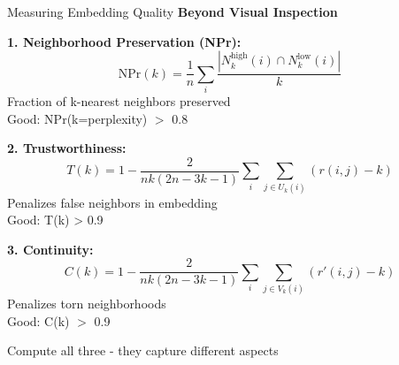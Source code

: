 \documentclass[10pt]{beamer}
\newcommand{\emphtext}[1]{\textcolor{upcblue}{\textbf{#1}}}
\newcommand{\conceptbox}[1]{\colorbox{upcblue!10}{\begin{minipage}{0.85\textwidth}\centering #1\end{minipage}}}
\begin{document}
\begin{frame}{Measuring Embedding Quality}
\emphtext{Beyond Visual Inspection}

\vspace{0.3cm}
\textbf{1. Neighborhood Preservation (NPr):}
$$\text{NPr}(k) = \frac{1}{n}\sum_i \frac{|N_k^{\text{high}}(i) \cap N_k^{\text{low}}(i)|}{k}$$
\footnotesize
Fraction of k-nearest neighbors preserved\\
Good: NPr(k=perplexity) $>$ 0.8

\vspace{0.2cm}
\textbf{2. Trustworthiness:}
$$T(k) = 1 - \frac{2}{nk(2n-3k-1)}\sum_i \sum_{j \in U_k(i)} (r(i,j) - k)$$
\footnotesize
Penalizes false neighbors in embedding\\
Good: T(k) > 0.9

\vspace{0.2cm}
\textbf{3. Continuity:}
$$C(k) = 1 - \frac{2}{nk(2n-3k-1)}\sum_i \sum_{j \in V_k(i)} (r'(i,j) - k)$$
\footnotesize
Penalizes torn neighborhoods\\
Good: C(k) $>$ 0.9

\begin{center}
\conceptbox{\footnotesize Compute all three - they capture different aspects}
\end{center}
\end{frame}
\end{document}
